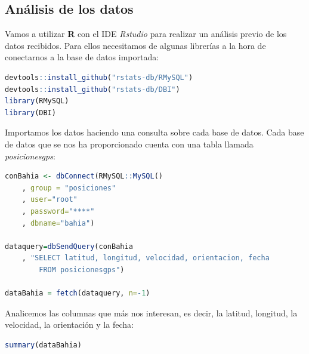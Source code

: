 \documentclass[a4paper, 12pt]{article}
\begin{document}
\smallskip


\pagebreak
\subsection{An\'alisis de los datos}

Vamos a utilizar \textbf{R} con el IDE \textit{Rstudio} para realizar un an\'alisis previo de los datos recibidos. Para ellos necesitamos de algunas librer\'ias a la hora de conectarnos a la base de datos importada:\\

\begin{lstlisting}[language=R, columns=fullflexible, basicstyle=\small, frame=tblr]
devtools::install_github("rstats-db/RMySQL")
devtools::install_github("rstats-db/DBI")
library(RMySQL)
library(DBI)
\end{lstlisting}

\smallskip

Importamos los datos haciendo una consulta sobre cada base de datos. Cada base de datos que se nos ha proporcionado cuenta con una tabla llamada \textit{posicionesgps}:\\

\begin{lstlisting}[language=R, columns=fullflexible, basicstyle=\small,frame=tbrl, showstringspaces=false]
conBahia <- dbConnect(RMySQL::MySQL()
	, group = "posiciones"
	, user="root"
	, password="****"
	, dbname="bahia")

dataquery=dbSendQuery(conBahia
	, "SELECT latitud, longitud, velocidad, orientacion, fecha 
		FROM posicionesgps")

dataBahia = fetch(dataquery, n=-1)
\end{lstlisting}

\smallskip

Analicemos las columnas que m\'as nos interesan, es decir, la latitud, longitud, la velocidad, la orientaci\'on y la fecha: \\

\begin{lstlisting}[language=R, basicstyle=\small, columns=fullflexible, frame=tbrl, showstringspaces=false]
summary(dataBahia)
\end{lstlisting}

\bigskip 
\end{document}
